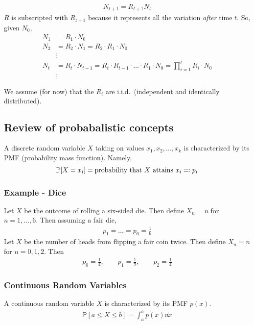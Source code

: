 \documentclass{article}
\newcommand{\prob}{\mathbb{P}}
\begin{document}
        \begin{align*}
            N_{t+1} = R_{t+1}N_t
        \end{align*}
        $R$ is subscripted with $R_{t+1}$ because it represents all the variation \emph{after} time $t$.  So, given $N_0$,
        \begin{align*}
            N_1 &= R_1\cdot N_0 \\
            N_2 &= R_2\cdot N_1 = R_2\cdot R_1\cdot N_0 \\
            &\vdots \\
            N_t &= R_t\cdot N_{t-1} = R_t\cdot R_{t-1}\cdot \dots \cdot R_1\cdot N_0 = \prod_{i=1}^tR_i \cdot N_0 \\
            &\vdots
        \end{align*}

        We assume (for now) that the $R_i$ are i.i.d.~(independent and identically distributed).
        \subsection{Review of probabalistic concepts}
            A discrete random variable $X$ taking on values $x_1,x_2,\dots,x_k$ is characterized by its PMF (probability mass function).  Namely,
            \begin{align*}
                \prob\qty[X = x_i] = \text{probability that $X$ attains $x_i$} \eqqcolon p_i
            \end{align*}
            \subsubsection{Example - Dice}
                Let $X$ be the outcome of rolling a six-sided die.  Then define $X_n = n$ for $n=1,\dots,6$.  Then assuming a fair die,
                \begin{align*}
                    p_1 = \dots = p_6 = \frac{1}{6}
                \end{align*}
                Let $X$ be the number of heads from flipping a fair coin twice.  Then define $X_n = n$ for $n = 0,1,2$.  Then
                \begin{align*}
                    p_0 = \frac{1}{4}, \qquad p_1 = \frac{1}{2}, \qquad p_2 = \frac{1}{4}
                \end{align*}
            \subsubsection{Continuous Random Variables}
                A continuous random variable $X$ is characterized by its PMF $p(x)$.
                \begin{align*}
                    \prob[a \leq X \leq b] = \int_a^bp(x)\dd x
                \end{align*}
\end{document}
